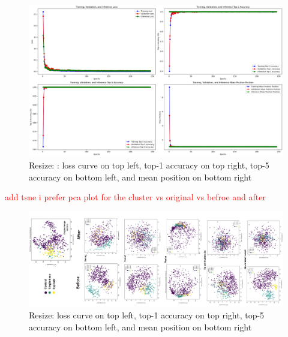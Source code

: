 \begin{figure}[H]
  \centering
  \includegraphics[scale=0.3]{figures/Resize.png} 
  \caption{Resize: : loss curve on top left, top-1 accuracy on top right, top-5 accuracy on bottom left, and mean position on bottom right}
  \label{fig:Resize_b64}
\end{figure}


\textcolor{red}{add tsne i prefer pca plot for the cluster vs original vs befroe and after}

\begin{figure}[H]
  \centering
  \includegraphics[scale=0.5, angle=-90]{figures/pca_viz.png} 
  \caption{Resize: loss curve on top left, top-1 accuracy on top right, top-5 accuracy on bottom left, and mean position on bottom right}
  \label{fig:Resize_b64}
\end{figure}
